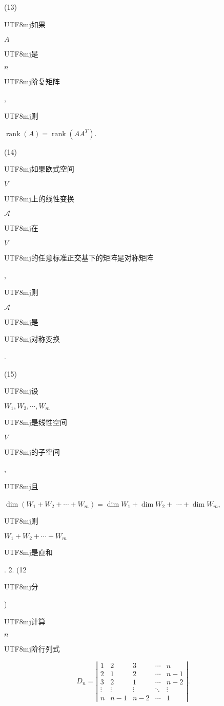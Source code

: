 \documentclass[10pt]{article}
\begin{document}
(13) \begin{CJK}{UTF8}{mj}如果\end{CJK} $A$ \begin{CJK}{UTF8}{mj}是\end{CJK} $n$ \begin{CJK}{UTF8}{mj}阶复矩阵\end{CJK}, \begin{CJK}{UTF8}{mj}则\end{CJK} $\operatorname{rank}(A)=\operatorname{rank}\left(A A^{T}\right)$.

(14) \begin{CJK}{UTF8}{mj}如果欧式空间\end{CJK} $V$ \begin{CJK}{UTF8}{mj}上的线性变换\end{CJK} $\mathscr{A}$ \begin{CJK}{UTF8}{mj}在\end{CJK} $V$ \begin{CJK}{UTF8}{mj}的任意标准正交基下的矩阵是对称矩阵\end{CJK},\begin{CJK}{UTF8}{mj}则\end{CJK} $\mathscr{A}$ \begin{CJK}{UTF8}{mj}是\end{CJK} \begin{CJK}{UTF8}{mj}对称变换\end{CJK}.

(15) \begin{CJK}{UTF8}{mj}设\end{CJK} $W_{1}, W_{2}, \cdots, W_{m}$ \begin{CJK}{UTF8}{mj}是线性空间\end{CJK} $V$ \begin{CJK}{UTF8}{mj}的子空间\end{CJK}, \begin{CJK}{UTF8}{mj}且\end{CJK} $\operatorname{dim}\left(W_{1}+W_{2}+\cdots+W_{m}\right)=\operatorname{dim} W_{1}+\operatorname{dim} W_{2}+$ $\cdots+\operatorname{dim} W_{m}$, \begin{CJK}{UTF8}{mj}则\end{CJK} $W_{1}+W_{2}+\cdots+W_{m}$ \begin{CJK}{UTF8}{mj}是直和\end{CJK}. 2. (12 \begin{CJK}{UTF8}{mj}分\end{CJK}) \begin{CJK}{UTF8}{mj}计算\end{CJK} $n$ \begin{CJK}{UTF8}{mj}阶行列式\end{CJK}
$$
D_{n}=\left|\begin{array}{ccccc}
1 & 2 & 3 & \cdots & n \\
2 & 1 & 2 & \cdots & n-1 \\
3 & 2 & 1 & \cdots & n-2 \\
\vdots & \vdots & \vdots & \ddots & \vdots \\
n & n-1 & n-2 & \cdots & 1
\end{array}\right| .
$$
\end{document}

